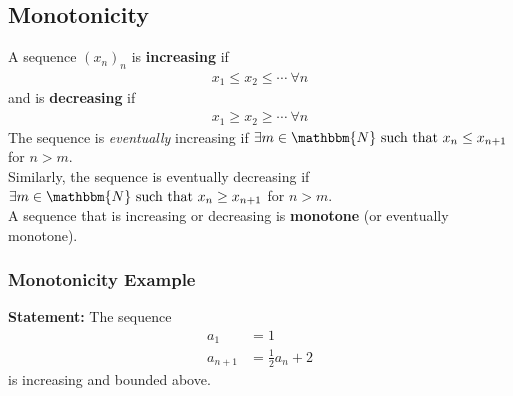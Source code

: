 \documentclass[10pt]{extarticle}
\newcommand{\N}{\mathbbm{N}}
\begin{document}
    \subsection{Monotonicity}%
    A sequence $(x_n)_n$ is \textbf{increasing} if
    \begin{align*}
      x_1 \leq x_2 \leq \cdots~\forall n
    \end{align*}
    and is \textbf{decreasing} if
    \begin{align*}
      x_1 \geq x_2 \geq \cdots~\forall n
    \end{align*}
    The sequence is \textsl{eventually} increasing if $\exists m\in \N \text{ such that } x_n \leq x_{n+1}$ for $n > m$.\\

    Similarly, the sequence is eventually decreasing if $\exists m\in\N \text{ such that } x_n \geq x_{n+1}$ for $n > m$.\\

    A sequence that is increasing or decreasing is \textbf{monotone} (or eventually monotone).
    \subsubsection{Monotonicity Example}%
    \textbf{Statement:} The sequence
    \begin{align*}
      a_1 &= 1\\
      a_{n+1} &= \frac{1}{2}a_n + 2
    \end{align*}
    is increasing and bounded above.\\
\end{document}
